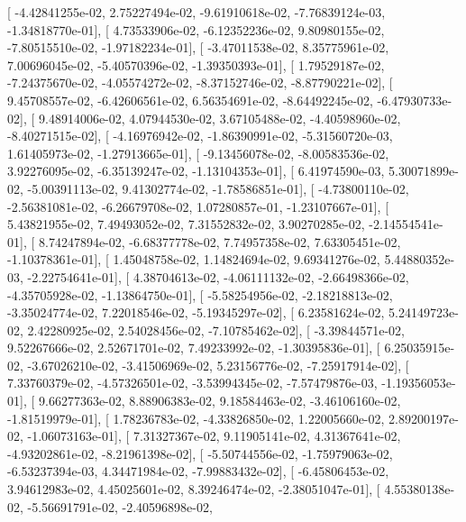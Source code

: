 \documentclass{article}
\begin{document}
       [ -4.42841255e-02,   2.75227494e-02,  -9.61910618e-02,
         -7.76839124e-03,  -1.34818770e-01],
       [  4.73533906e-02,  -6.12352236e-02,   9.80980155e-02,
         -7.80515510e-02,  -1.97182234e-01],
       [ -3.47011538e-02,   8.35775961e-02,   7.00696045e-02,
         -5.40570396e-02,  -1.39350393e-01],
       [  1.79529187e-02,  -7.24375670e-02,  -4.05574272e-02,
         -8.37152746e-02,  -8.87790221e-02],
       [  9.45708557e-02,  -6.42606561e-02,   6.56354691e-02,
         -8.64492245e-02,  -6.47930733e-02],
       [  9.48914006e-02,   4.07944530e-02,   3.67105488e-02,
         -4.40598960e-02,  -8.40271515e-02],
       [ -4.16976942e-02,  -1.86390991e-02,  -5.31560720e-03,
          1.61405973e-02,  -1.27913665e-01],
       [ -9.13456078e-02,  -8.00583536e-02,   3.92276095e-02,
         -6.35139247e-02,  -1.13104353e-01],
       [  6.41974590e-03,   5.30071899e-02,  -5.00391113e-02,
          9.41302774e-02,  -1.78586851e-01],
       [ -4.73800110e-02,  -2.56381081e-02,  -6.26679708e-02,
          1.07280857e-01,  -1.23107667e-01],
       [  5.43821955e-02,   7.49493052e-02,   7.31552832e-02,
          3.90270285e-02,  -2.14554541e-01],
       [  8.74247894e-02,  -6.68377778e-02,   7.74957358e-02,
          7.63305451e-02,  -1.10378361e-01],
       [  1.45048758e-02,   1.14824694e-02,   9.69341276e-02,
          5.44880352e-03,  -2.22754641e-01],
       [  4.38704613e-02,  -4.06111132e-02,  -2.66498366e-02,
         -4.35705928e-02,  -1.13864750e-01],
       [ -5.58254956e-02,  -2.18218813e-02,  -3.35024774e-02,
          7.22018546e-02,  -5.19345297e-02],
       [  6.23581624e-02,   5.24149723e-02,   2.42280925e-02,
          2.54028456e-02,  -7.10785462e-02],
       [ -3.39844571e-02,   9.52267666e-02,   2.52671701e-02,
          7.49233992e-02,  -1.30395836e-01],
       [  6.25035915e-02,  -3.67026210e-02,  -3.41506969e-02,
          5.23156776e-02,  -7.25917914e-02],
       [  7.33760379e-02,  -4.57326501e-02,  -3.53994345e-02,
         -7.57479876e-03,  -1.19356053e-01],
       [  9.66277363e-02,   8.88906383e-02,   9.18584463e-02,
         -3.46106160e-02,  -1.81519979e-01],
       [  1.78236783e-02,  -4.33826850e-02,   1.22005660e-02,
          2.89200197e-02,  -1.06073163e-01],
       [  7.31327367e-02,   9.11905141e-02,   4.31367641e-02,
         -4.93202861e-02,  -8.21961398e-02],
       [ -5.50744556e-02,  -1.75979063e-02,  -6.53237394e-03,
          4.34471984e-02,  -7.99883432e-02],
       [ -6.45806453e-02,   3.94612983e-02,   4.45025601e-02,
          8.39246474e-02,  -2.38051047e-01],
       [  4.55380138e-02,  -5.56691791e-02,  -2.40596898e-02,
\end{document}
